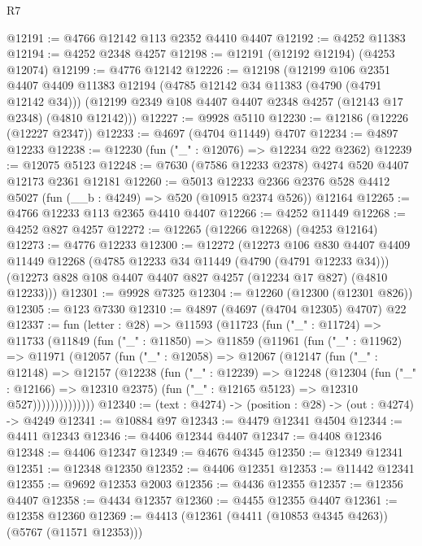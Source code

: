 \begin{lexlean}{R7}
\begin{coremodule}
@12191 := @4766 @12142 @113 @2352 @4410 @4407
@12192 := @4252 @11383
@12194 := @4252 @2348 @4257
@12198 := @12191 (@12192 @12194) (@4253 @12074)
@12199 := @4776 @12142
@12226 := @12198
    (@12199
      @106
      @2351
      @4407
      @4409
      @11383
      @12194
      (@4785 @12142 @34 @11383 (@4790 (@4791 @12142 @34)))
      (@12199 @2349 @108 @4407 @4407 @2348 @4257 (@12143 @17 @2348) (@4810 @12142)))
@12227 := @9928 @5110
@12230 := @12186 (@12226 (@12227 @2347))
@12233 := @4697 (@4704 @11449) @4707
@12234 := @4897 @12233
@12238 := @12230 (fun ("_" : @12076) => @12234 @22 @2362)
@12239 := @12075 @5123
@12248 := @7630 (@7586 @12233 @2378) @4274 @520 @4407 @12173 @2361 @12181
@12260 := @5013
    @12233
    @2366
    @2376
    @528
    @4412
    @5027
    (fun (__b : @4249) => @520 (@10915 @2374 @526))
    @12164
@12265 := @4766 @12233 @113 @2365 @4410 @4407
@12266 := @4252 @11449
@12268 := @4252 @827 @4257
@12272 := @12265 (@12266 @12268) (@4253 @12164)
@12273 := @4776 @12233
@12300 := @12272
    (@12273
      @106
      @830
      @4407
      @4409
      @11449
      @12268
      (@4785 @12233 @34 @11449 (@4790 (@4791 @12233 @34)))
      (@12273 @828 @108 @4407 @4407 @827 @4257 (@12234 @17 @827) (@4810 @12233)))
@12301 := @9928 @7325
@12304 := @12260 (@12300 (@12301 @826))
@12305 := @123 @7330
@12310 := @4897 (@4697 (@4704 @12305) @4707) @22
@12337 := fun (letter : @28) =>
  @11593
    (@11723
      (fun ("_" : @11724) =>
      @11733
        (@11849
          (fun ("_" : @11850) =>
          @11859
            (@11961
              (fun ("_" : @11962) =>
              @11971
                (@12057
                  (fun ("_" : @12058) =>
                  @12067
                    (@12147
                      (fun ("_" : @12148) =>
                      @12157
                        (@12238
                          (fun ("_" : @12239) =>
                          @12248
                            (@12304
                              (fun ("_" : @12166) => @12310 @2375)
                              (fun ("_" : @12165 @5123) => @12310 @527))))))))))))))
@12340 := (text : @4274) -> (position : @28) -> (out : @4274) -> @4249
@12341 := @10884 @97
@12343 := @4479 @12341 @4504
@12344 := @4411 @12343
@12346 := @4406 @12344 @4407
@12347 := @4408 @12346
@12348 := @4406 @12347
@12349 := @4676 @4345
@12350 := @12349 @12341
@12351 := @12348 @12350
@12352 := @4406 @12351
@12353 := @11442 @12341
@12355 := @9692 @12353 @2003
@12356 := @4436 @12355
@12357 := @12356 @4407
@12358 := @4434 @12357
@12360 := @4455 @12355 @4407
@12361 := @12358 @12360
@12369 := @4413 (@12361 (@4411 (@10853 @4345 @4263)) (@5767 (@11571 @12353)))

\end{coremodule}
\end{lexlean}
